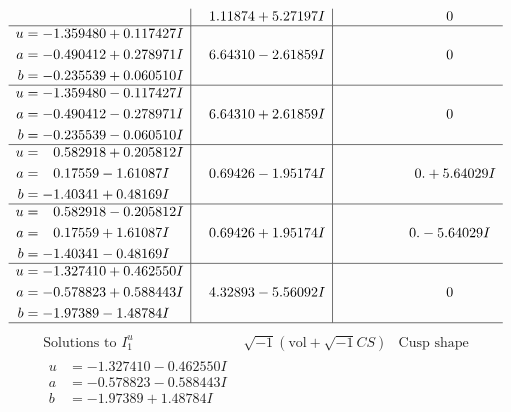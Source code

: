 \documentclass[1p]{elsarticle_modified}
\theoremstyle{definition}
\newcommand{\I}{\sqrt{-1}}
\begin{document}
$$\begin{array}{c|c|c}
 & \phantom{-}1.11874 + 5.27197 I & \phantom{-0.000000 } 0 \\ \hline\begin{aligned}
u &= -1.359480 + 0.117427 I \\
a &= -0.490412 + 0.278971 I \\
b &= -0.235539 + 0.060510 I\end{aligned}
 & \phantom{-}6.64310 - 2.61859 I & \phantom{-0.000000 } 0 \\ \hline\begin{aligned}
u &= -1.359480 - 0.117427 I \\
a &= -0.490412 - 0.278971 I \\
b &= -0.235539 - 0.060510 I\end{aligned}
 & \phantom{-}6.64310 + 2.61859 I & \phantom{-0.000000 } 0 \\ \hline\begin{aligned}
u &= \phantom{-}0.582918 + 0.205812 I \\
a &= \phantom{-}0.17559 - 1.61087 I \\
b &= -1.40341 + 0.48169 I\end{aligned}
 & \phantom{-}0.69426 - 1.95174 I & \phantom{-0.000000 -}0. + 5.64029 I \\ \hline\begin{aligned}
u &= \phantom{-}0.582918 - 0.205812 I \\
a &= \phantom{-}0.17559 + 1.61087 I \\
b &= -1.40341 - 0.48169 I\end{aligned}
 & \phantom{-}0.69426 + 1.95174 I & \phantom{-0.000000 } 0. - 5.64029 I \\ \hline\begin{aligned}
u &= -1.327410 + 0.462550 I \\
a &= -0.578823 + 0.588443 I \\
b &= -1.97389 - 1.48784 I\end{aligned}
 & \phantom{-}4.32893 - 5.56092 I & \phantom{-0.000000 } 0\\
 \hline 
 \end{array}$$\newpage$$\begin{array}{c|c|c}  
\text{Solutions to }I^u_{1}& \I (\text{vol} + \sqrt{-1}CS) & \text{Cusp shape}\\
 \hline 
\begin{aligned}
u &= -1.327410 - 0.462550 I \\
a &= -0.578823 - 0.588443 I \\
b &= -1.97389 + 1.48784 I\end{aligned}

\end{array}$$
\end{document}

